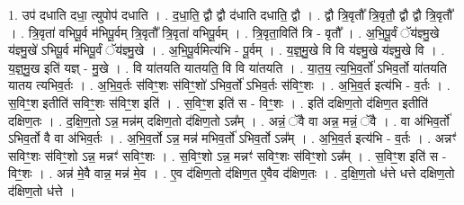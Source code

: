 \documentclass[17pt]{extarticle}
\begin{document}
1. उप॑ दधाति दधा॒ त्युपोप॑ दधाति । . द॒धा॒ति॒ द्वौ द्वौ द॑धाति दधाति॒ द्वौ । . द्वौ त्रि॒वृतौ᳚ त्रि॒वृतौ॒ द्वौ द्वौ त्रि॒वृतौ᳚ । . त्रि॒वृता॑ वभिपू॒र्व म॑भिपू॒र्वम् त्रि॒वृतौ᳚ त्रि॒वृता॑ वभिपू॒र्वम् । . त्रि॒वृता॒विति॑ त्रि - वृतौ᳚ । . अ॒भि॒पू॒र्वं ॅय॑ज्ञ्मु॒खे य॑ज्ञ्मु॒खे॑ ऽभिपू॒र्व म॑भिपू॒र्वं ॅय॑ज्ञ्मु॒खे । . अ॒भि॒पू॒र्वमित्य॑भि - पू॒र्वम् । . य॒ज्ञ्॒मु॒खे वि वि य॑ज्ञ्मु॒खे य॑ज्ञ्मु॒खे वि । . य॒ज्ञ्॒मु॒ख इति॑ यज्ञ् - मु॒खे । . वि या॑तयति यातयति॒ वि वि या॑तयति । . या॒त॒य॒ त्य॒भि॒व॒र्तो॑ ऽभिव॒र्तो या॑तयति यातय त्यभिव॒र्तः । . अ॒भि॒व॒र्तः स॑विꣳ॒॒शः स॑विꣳ॒॒शो॑ ऽभिव॒र्तो॑ ऽभिव॒र्तः स॑विꣳ॒॒शः । . अ॒भि॒व॒र्त इत्य॑भि - व॒र्तः । . स॒विꣳ॒॒श इतीति॑ सविꣳ॒॒शः स॑विꣳ॒॒श इति॑ । . स॒विꣳ॒॒श इति॑ स - विꣳ॒॒शः । . इति॑ दक्षिण॒तो द॑क्षिण॒त इतीति॑ दक्षिण॒तः । . द॒क्षि॒ण॒तो ऽन्न॒ मन्न॑म् दक्षिण॒तो द॑क्षिण॒तो ऽन्न᳚म् । . अन्नं॒ ॅवै वा अन्न॒ मन्नं॒ ॅवै । . वा अ॑भिव॒र्तो॑ ऽभिव॒र्तो वै वा अ॑भिव॒र्तः । . अ॒भि॒व॒र्तो ऽन्न॒ मन्न॑ मभिव॒र्तो॑ ऽभिव॒र्तो ऽन्न᳚म् । . अ॒भि॒व॒र्त इत्य॑भि - व॒र्तः । . अन्नꣳ॑ सविꣳ॒॒शः स॑विꣳ॒॒शो ऽन्न॒ मन्नꣳ॑ सविꣳ॒॒शः । . स॒विꣳ॒॒शो ऽन्न॒ मन्नꣳ॑ सविꣳ॒॒शः स॑विꣳ॒॒शो ऽन्न᳚म् । . स॒विꣳ॒॒श इति॑ स - विꣳ॒॒शः । . अन्न॑ मे॒वै वान्न॒ मन्न॑ मे॒व । . ए॒व द॑क्षिण॒तो द॑क्षिण॒त ए॒वैव द॑क्षिण॒तः । . द॒क्षि॒ण॒तो ध॑त्ते धत्ते दक्षिण॒तो द॑क्षिण॒तो ध॑त्ते । \newline
\end{document}
